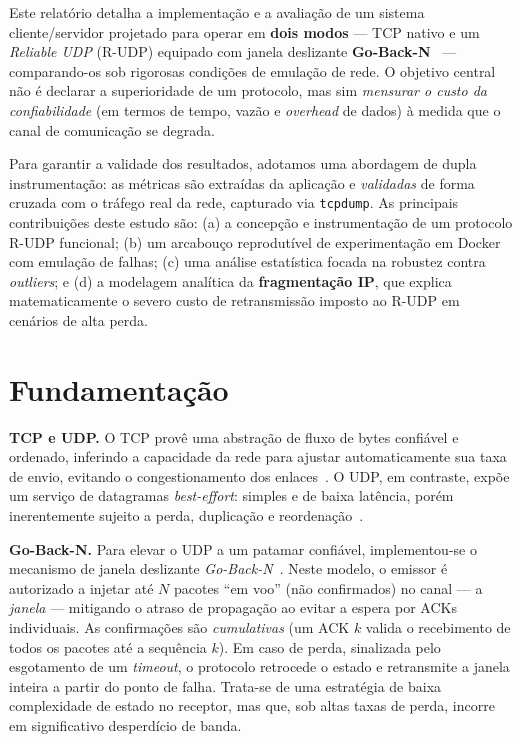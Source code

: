 \documentclass[12pt]{article}
\begin{document}
Este relatório detalha a implementação e a avaliação de um sistema cliente/servidor projetado 
para operar em \textbf{dois modos} --- TCP nativo e um \emph{Reliable UDP} (R-UDP) equipado 
com janela deslizante \textbf{Go-Back-N}~\cite{kurose2017} --- comparando-os sob rigorosas 
condições de emulação de rede. O objetivo central não é declarar a superioridade de um protocolo, 
mas sim \emph{mensurar o custo da confiabilidade} (em termos de tempo, vazão e \emph{overhead} 
de dados) à medida que o canal de comunicação se degrada. 

Para garantir a validade dos resultados, adotamos uma abordagem de dupla instrumentação: as métricas 
são extraídas da aplicação e \emph{validadas} de forma cruzada com o tráfego real da rede, 
capturado via \texttt{tcpdump}. As principais contribuições deste estudo são: (a) a concepção e 
instrumentação de um protocolo R-UDP funcional; (b) um arcabouço reprodutível de experimentação em Docker 
com emulação de falhas; (c) uma análise estatística focada na robustez contra \emph{outliers}; e 
(d) a modelagem analítica da \textbf{fragmentação IP}, que explica matematicamente o severo custo de 
retransmissão imposto ao R-UDP em cenários de alta perda.

\section{Fundamentação}

\textbf{TCP e UDP.} O TCP provê uma abstração de fluxo de bytes confiável e ordenado, inferindo
a capacidade da rede para ajustar automaticamente sua taxa de envio, evitando o congestionamento 
dos enlaces~\cite{rfc793,tanenbaum2011}. O UDP, em contraste, expõe um serviço de datagramas \emph{best-effort}:
simples e de baixa latência, porém inerentemente sujeito a perda, duplicação e reordenação~\cite{rfc768}.

\textbf{Go-Back-N.} Para elevar o UDP a um patamar confiável, implementou-se o mecanismo de janela 
deslizante \emph{Go-Back-N}~\cite{kurose2017}. Neste modelo, o emissor é autorizado a injetar até $N$ pacotes
``em voo'' (não confirmados) no canal --- a \emph{janela} --- mitigando o atraso de propagação ao evitar
a espera por ACKs individuais. As confirmações são \emph{cumulativas} (um ACK $k$ valida o recebimento de todos 
os pacotes até a sequência $k$). Em caso de perda, sinalizada pelo esgotamento de um \emph{timeout}, o 
protocolo retrocede o estado e retransmite a janela inteira a partir do ponto de falha. Trata-se de uma 
estratégia de baixa complexidade de estado no receptor, mas que, sob altas taxas de perda, incorre 
em significativo desperdício de banda.
\end{document}
